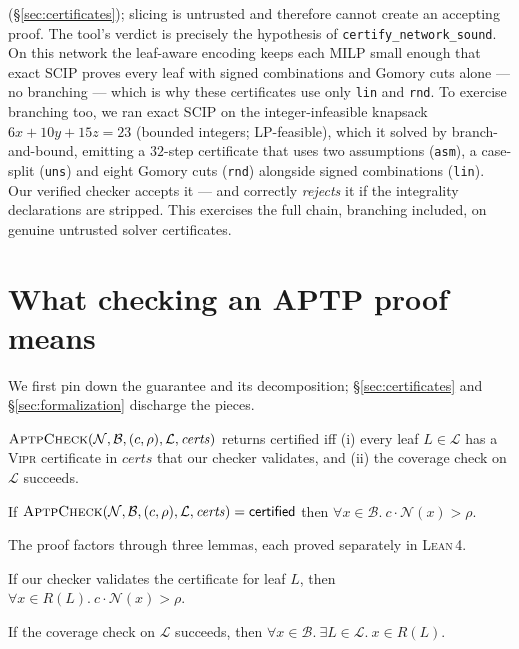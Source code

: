 \documentclass[runningheads]{llncs}
\newcommand{\net}{\mathcal{N}}
\newcommand{\reg}{R}
\newcommand{\dom}{\mathcal{B}}          %
\newcommand{\leaf}{L}
\newcommand{\leaves}{\mathcal{L}}
\newcommand{\vipr}{\textsc{Vipr}}
\newcommand{\scip}{\textsc{SCIP}}
\newcommand{\tool}{\textsc{AptpCheck}}
\newcommand{\lean}{\textsc{Lean\,4}}
\newcommand{\sound}{\textsf{certified}}
\newcommand{\code}[1]{\texttt{#1}}
\begin{document}
(\S\ref{sec:certificates}); slicing is untrusted and therefore cannot create an
accepting proof. The tool's verdict is precisely the hypothesis of
\code{certify\_network\_sound}. On this network the leaf-aware encoding keeps each MILP
small enough that exact \scip{} proves every leaf with signed combinations and Gomory
cuts alone --- no branching --- which is why these certificates use only \code{lin} and
\code{rnd}. To exercise branching too, we ran exact \scip{} on the integer-infeasible
knapsack $6x+10y+15z=23$ (bounded integers; LP-feasible), which it solved by
branch-and-bound, emitting a $32$-step certificate that uses two assumptions
(\code{asm}), a case-split (\code{uns}) and eight Gomory cuts (\code{rnd}) alongside
signed combinations (\code{lin}). Our verified checker accepts it --- and correctly
\emph{rejects} it if the integrality declarations are stripped. This exercises the full
chain, branching included, on genuine untrusted solver certificates.

\section{What checking an APTP proof means}\label{sec:checking}

We first pin down the guarantee and its decomposition; \S\ref{sec:certificates}
and \S\ref{sec:formalization} discharge the pieces.

\begin{definition}
$\tool(\net,\dom,(c,\rho),\leaves,\mathit{certs})$ returns \sound{} iff (i) every
leaf $\leaf\in\leaves$ has a \vipr{} certificate in $\mathit{certs}$ that our
checker validates, and (ii) the coverage check on $\leaves$ succeeds.
\end{definition}

\begin{theorem}[Soundness]\label{thm:main}
If $\tool(\net,\dom,(c,\rho),\leaves,\mathit{certs})=\sound$ then
$\forall x\in\dom.\ c\cdot\net(x) > \rho$.
\end{theorem}

The proof factors through three lemmas, each proved separately in \lean.

\begin{lemma}\label{lem:leaf}
If our checker validates the certificate for leaf $\leaf$, then
$\forall x\in \reg(\leaf).\ c\cdot\net(x) > \rho$.
\end{lemma}

\begin{lemma}[Coverage]\label{lem:cover}
If the coverage check on $\leaves$ succeeds, then
$\forall x\in\dom.\ \exists \leaf\in\leaves.\ x\in\reg(\leaf)$.
\end{lemma}
\end{document}
